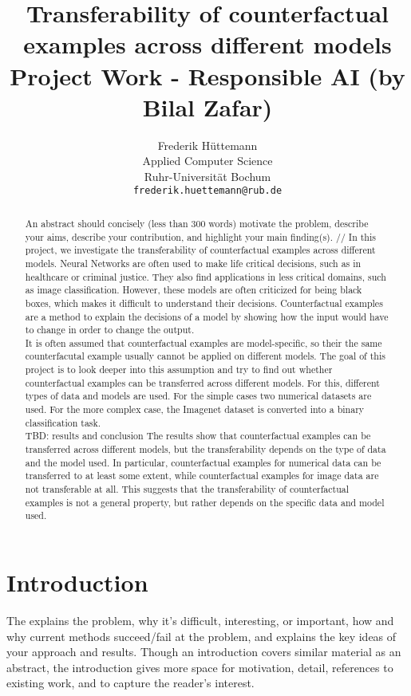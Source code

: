 \documentclass{article}
\title{
  Transferability of counterfactual examples across different models\\
  \vspace{1em}
  \small{\normalfont Project Work - Responsible AI (by Bilal Zafar)}
}
\author{
  Frederik Hüttemann \\
  Applied Computer Science\\
  Ruhr-Universität Bochum \\
  \texttt{frederik.huettemann@rub.de} \\
}
\begin{document}
\maketitle

\begin{abstract}
An abstract should concisely (less than 300 words) motivate the problem, describe your aims, describe your contribution, and highlight your main finding(s). //
In this project, we investigate the transferability of counterfactual examples across different models. Neural Networks are often used to make life critical decisions, such as in healthcare or criminal justice. They also find applications in less critical domains, such as image classification. However, these models are often criticized for being black boxes, which makes it difficult to understand their decisions. Counterfactual examples are a method to explain the decisions of a model by showing how the input would have to change in order to change the output. \\
It is often assumed that counterfactual examples are model-specific, so their the same counterfacutal example usually cannot be applied on different models. The goal of this project is to look deeper into this assumption and try to find out whether counterfactual examples can be transferred across different models. For this, different types of data and models are used. For the simple cases two numerical datasets are used. For the more complex case, the Imagenet dataset is converted into a binary classification task.\\
TBD: results and conclusion
The results show that counterfactual examples can be transferred across different models, but the transferability depends on the type of data and the model used. In particular, counterfactual examples for numerical data can be transferred to at least some extent, while counterfactual examples for image data are not transferable at all. This suggests that the transferability of counterfactual examples is not a general property, but rather depends on the specific data and model used.
\end{abstract}


\section{Introduction}
The explains the problem, why it's difficult, interesting, or important, how and why current methods succeed/fail at the problem, and explains the key ideas of your approach and results. Though an introduction covers similar material as an abstract, the introduction gives more space for motivation, detail, references to existing work, and to capture the reader's interest.
\end{document}

